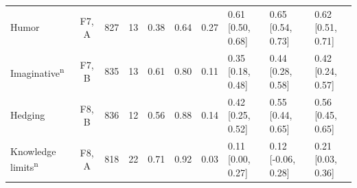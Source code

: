 {\begin{tabular}{@{}l c rr cc c l l l@{}}
Humor & F7, A & 827 & 13 & 0.38 & 0.64 & 0.27 & 0.61 {\scriptsize[0.50, 0.68]} & 0.65 {\scriptsize[0.54, 0.73]} & 0.62 {\scriptsize[0.51, 0.71]} \\
Imaginative\textsuperscript{n} & F7, B & 835 & 13 & 0.61 & 0.80 & 0.11 & 0.35 {\scriptsize[0.18, 0.48]} & 0.44 {\scriptsize[0.28, 0.58]} & 0.42 {\scriptsize[0.24, 0.57]} \\
Hedging & F8, B & 836 & 12 & 0.56 & 0.88 & 0.14 & 0.42 {\scriptsize[0.25, 0.52]} & 0.55 {\scriptsize[0.44, 0.65]} & 0.56 {\scriptsize[0.45, 0.65]} \\
Knowledge limits\textsuperscript{n} & F8, A & 818 & 22 & 0.71 & 0.92 & 0.03 & 0.11 {\scriptsize[0.00, 0.27]} & 0.12 {\scriptsize[-0.06, 0.28]} & 0.21 {\scriptsize[0.03, 0.36]} \\
\bottomrule
\end{tabular}}
